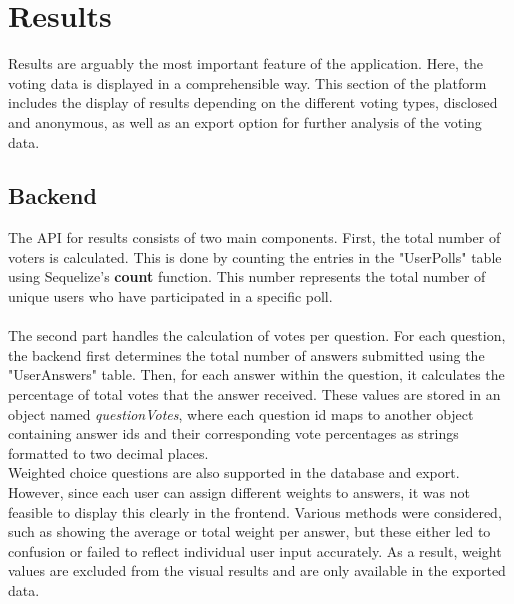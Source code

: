 \documentclass[a4paper,12pt]{report}
\begin{document}
\section{Results}
Results are arguably the most important feature of the application. Here, the voting data is displayed in a comprehensible way. This section of the platform includes the display of results depending on the different voting types, disclosed and anonymous, as well as an export option for further analysis of the voting data. \\

\subsection{Backend}
The API for results consists of two main components. First, the total number of voters is calculated. This is done by counting the entries in the "UserPolls" table using Sequelize's \textbf{count} function. This number represents the total number of unique users who have participated in a specific poll. \\ \\
The second part handles the calculation of votes per question. For each question, the backend first determines the total number of answers submitted using the "UserAnswers" table. Then, for each answer within the question, it calculates the percentage of total votes that the answer received. These values are stored in an object named \textit{questionVotes}, where each question id maps to another object containing answer ids and their corresponding vote percentages as strings formatted to two decimal places. \\
Weighted choice questions are also supported in the database and export. However, since each user can assign different weights to answers, it was not feasible to display this clearly in the frontend. Various methods were considered, such as showing the average or total weight per answer, but these either led to confusion or failed to reflect individual user input accurately. As a result, weight values are excluded from the visual results and are only available in the exported data. \\
\end{document}
